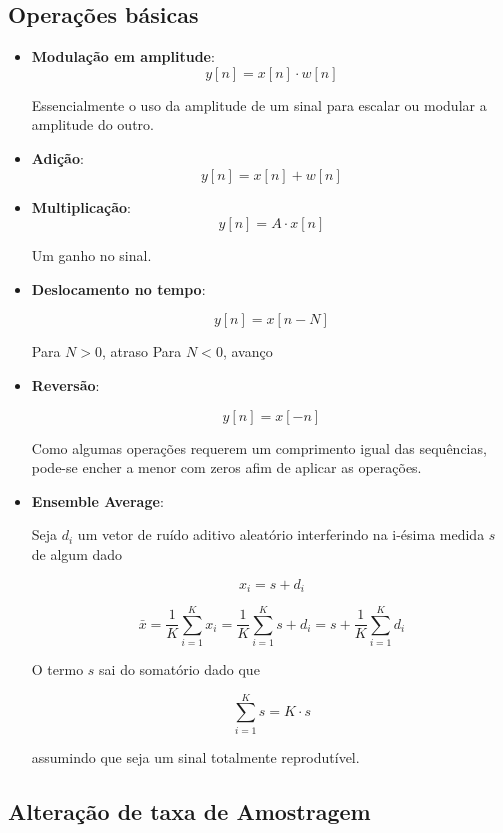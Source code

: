 \subsection{Operações básicas}
\begin{itemize}
    \item \textbf{Modulação em amplitude}:
    \[y[n] = x[n] \cdot w[n] \]

    Essencialmente o uso da amplitude de um sinal para escalar ou modular a amplitude do outro.

    \item \textbf{Adição}:
    \[y[n] = x[n] + w[n] \]

    \item \textbf{Multiplicação}:
    \[y[n] = A \cdot x[n] \]

    Um ganho no sinal.

    \item \textbf{Deslocamento no tempo}:
    
    \[y[n] = x[n - N] \]

    Para $N > 0$, atraso
    Para $N < 0$, avanço

    \item \textbf{Reversão}:
    
    \[y[n] = x[-n]\]

    Como algumas operações requerem um comprimento igual das sequências, pode-se encher a menor com zeros afim de aplicar as operações.

    \item \textbf{Ensemble Average}:
    
    Seja $d_{i}$ um vetor de ruído aditivo aleatório interferindo na i-ésima medida $s$ de algum dado

    \[x_{i} = s + d_{i}\]

    \[ \bar{x} = \frac{1}{K} \sum_{i = 1}^{K}x_{i} = \frac{1}{K} \sum_{i = 1}^{K}s + d_{i} = s + \frac{1}{K} \sum_{i = 1}^{K} d_{i} \]

    O termo $s$ sai do somatório dado que 

    \[\sum_{i = 1}^{K}s = K \cdot s\]

    assumindo que seja um sinal totalmente reprodutível. 
        
\end{itemize}

\subsection{Alteração de taxa de Amostragem}

